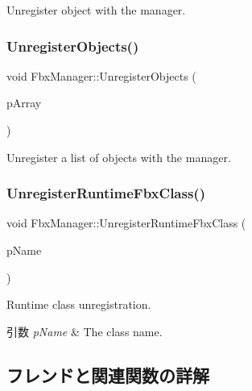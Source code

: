 Unregister object with the manager. \mbox{\label{class_fbx_manager_ad0efea934848eb58488905b51aa91b38}} 
\subsubsection{\texorpdfstring{Unregister\+Objects()}{UnregisterObjects()}}
{\footnotesize\ttfamily void Fbx\+Manager\+::\+Unregister\+Objects (\begin{DoxyParamCaption}\item[{const \hyperlink{class_fbx_array}{Fbx\+Array}$<$ \hyperlink{class_fbx_object}{Fbx\+Object} $\ast$$>$ \&}]{p\+Array }\end{DoxyParamCaption})}

Unregister a list of objects with the manager. \mbox{\label{class_fbx_manager_ab46a3ccf9aa7cf28f8b2b18223baeedb}} 
\subsubsection{\texorpdfstring{Unregister\+Runtime\+Fbx\+Class()}{UnregisterRuntimeFbxClass()}}
{\footnotesize\ttfamily void Fbx\+Manager\+::\+Unregister\+Runtime\+Fbx\+Class (\begin{DoxyParamCaption}\item[{const char $\ast$}]{p\+Name }\end{DoxyParamCaption})}

Runtime class unregistration. 
\begin{DoxyParams}{引数}
{\em p\+Name} & The class name. \\
\hline
\end{DoxyParams}


\subsection{フレンドと関連関数の詳解}
\mbox{\label{class_fbx_manager_af7d13209ce85d4c6e85c1012ccba1a71}} 
